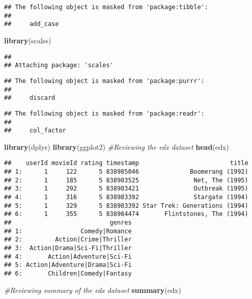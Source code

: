 \documentclass[
]{article}
\newenvironment{Shaded}{\begin{snugshade}}{\end{snugshade}}
\newcommand{\CommentTok}[1]{\textcolor[rgb]{0.56,0.35,0.01}{\textit{#1}}}
\newcommand{\KeywordTok}[1]{\textcolor[rgb]{0.13,0.29,0.53}{\textbf{#1}}}
\newcommand{\NormalTok}[1]{#1}
\begin{document}
\begin{verbatim}
## The following object is masked from 'package:tibble':
## 
##     add_case
\end{verbatim}

\begin{Shaded}
\begin{Highlighting}[]
\KeywordTok{library}\NormalTok{(scales)}
\end{Highlighting}
\end{Shaded}

\begin{verbatim}
## 
## Attaching package: 'scales'
\end{verbatim}

\begin{verbatim}
## The following object is masked from 'package:purrr':
## 
##     discard
\end{verbatim}

\begin{verbatim}
## The following object is masked from 'package:readr':
## 
##     col_factor
\end{verbatim}

\begin{Shaded}
\begin{Highlighting}[]
\KeywordTok{library}\NormalTok{(dplyr)}
\KeywordTok{library}\NormalTok{(ggplot2)}
\CommentTok{#Reviewing the edx dataset}
\KeywordTok{head}\NormalTok{(edx)}
\end{Highlighting}
\end{Shaded}

\begin{verbatim}
##    userId movieId rating timestamp                         title
## 1:      1     122      5 838985046              Boomerang (1992)
## 2:      1     185      5 838983525               Net, The (1995)
## 3:      1     292      5 838983421               Outbreak (1995)
## 4:      1     316      5 838983392               Stargate (1994)
## 5:      1     329      5 838983392 Star Trek: Generations (1994)
## 6:      1     355      5 838984474       Flintstones, The (1994)
##                           genres
## 1:                Comedy|Romance
## 2:         Action|Crime|Thriller
## 3:  Action|Drama|Sci-Fi|Thriller
## 4:       Action|Adventure|Sci-Fi
## 5: Action|Adventure|Drama|Sci-Fi
## 6:       Children|Comedy|Fantasy
\end{verbatim}

\begin{Shaded}
\begin{Highlighting}[]
\CommentTok{#Reviewing summary of the edx dataset}
\KeywordTok{summary}\NormalTok{(edx)}
\end{Highlighting}
\end{Shaded}
\end{document}

